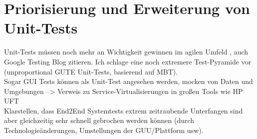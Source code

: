 \section{Priorisierung und Erweiterung von Unit-Tests}
\label{sec:discussion_unit}
Unit-Tests müssen noch mehr an Wichtigkeit gewinnen im agilen Umfeld \cite{linz_testing_2014}, auch Google Testing Blog zitieren. Ich schlage eine noch extremere Test-Pyramide vor (unproportional GUTE Unit-Tests, basierend auf MBT).\\
Sogar GUI Tests können als Unit-Test angesehen werden, mocken von Daten und Umgebungen --> Verweis zu Service-Virtualisierungen in großen Tools wie HP UFT\\
Klarstellen, dass End2End Systemtests extrem zeitraubende Unterfangen sind aber gleichzeitig sehr schnell gebrochen werden können (durch Technologieänderungen, Umstellungen der GUU/Plattform usw).



\fi\makeatother